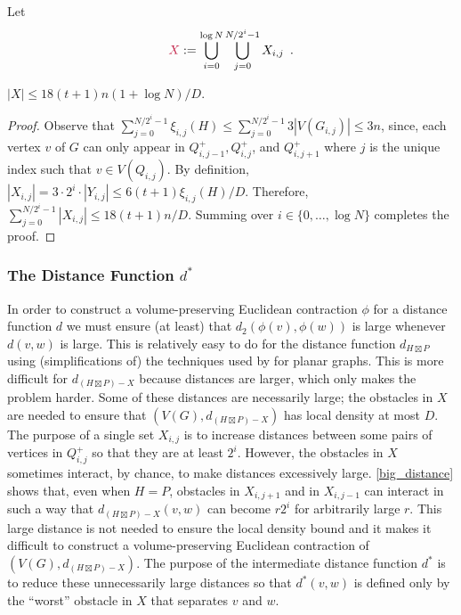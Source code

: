 \documentclass{patmorin}
\makeatletter
\renewcommand{\le}{\leqslant}
\def\mathcolor#1#{\@mathcolor{#1}}
\def\@mathcolor#1#2#3{%
  \protect\leavevmode
  \begingroup
    \color#1{#2}#3%
  \endgroup
}
\newcommand{\mathdefin}[1]{\mathcolor{brightmaroon}{#1}}
\makeatother
\begin{document}
Let 
\[
     \mathdefin{X}:=\bigcup_{i=0}^{\log N}\bigcup_{j=0}^{N/2^i-1} X_{i,j} \enspace .
\]

\begin{clm}\label{x_size}
  $|X|\le 18(t+1)n(1+\log N)/D$.
\end{clm}

\begin{proof}
  Observe that $\sum_{j=0}^{N/2^i-1} \xi_{i,j}(H)\le\sum_{j=0}^{N/2^i-1} 3|V(G_{i,j})| \le 3n$, since, each vertex $v$ of $G$ can only appear in $Q^+_{i,j-1}, Q^+_{i,j}$, and $Q^+_{i,j+1}$ where $j$ is the unique index such that $v\in V(Q_{i,j})$.    By definition, $|X_{i,j}|=3\cdot 2^i \cdot |Y_{i,j}| \le 6(t+1)\xi_{i,j}(H)/D$.  Therefore, $\sum_{j=0}^{N/2^i-1} |X_{i,j}|\le 18(t+1)n/D$. Summing over $i\in\{0,\ldots,\log N\}$ completes the proof.
\end{proof}

\subsubsection{\boldmath The Distance Function \texorpdfstring{$d^*$}{d*}}
\label{d_star_definition}

In order to construct a volume-preserving Euclidean contraction $\phi$ for a distance function $d$ we must ensure (at least) that $d_2(\phi(v),\phi(w))$ is large whenever $d(v,w)$ is large.  This is relatively easy to do for the distance function $d_{H\boxtimes P}$ using (simplifications of) the techniques used by \citet{rao:small} for planar graphs. This is more difficult for $d_{(H\boxtimes P)-X}$ because distances are larger, which only makes the problem harder.  Some of these distances are necessarily large; the obstacles in $X$ are needed to ensure that $(V(G),d_{(H\boxtimes P)-X})$ has local density at most $D$.  The purpose of a single set $X_{i,j}$ is to increase distances between some pairs of vertices in $Q^+_{i,j}$ so that they are at least $2^i$.  However, the obstacles in $X$ sometimes interact, by chance, to make distances excessively large. \cref{big_distance} shows that, even when $H=P$, obstacles in $X_{i,j+1}$ and in $X_{i,j-1}$ can interact in such a way that $d_{(H\boxtimes P)-X}(v,w)$ can become $r2^i$ for arbitrarily large $r$.  This large distance is not needed to ensure the local density bound and it makes it difficult to construct a volume-preserving Euclidean contraction of $(V(G),d_{(H\boxtimes P)-X})$.  The purpose of the intermediate distance function $d^*$ is to reduce these unnecessarily large distances so that $d^*(v,w)$ is defined only by the ``worst'' obstacle in $X$ that separates $v$ and $w$.
\end{document}
